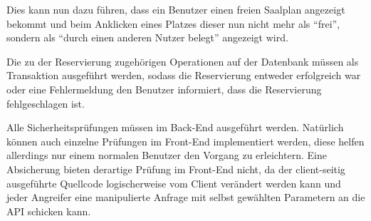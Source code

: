 Dies kann nun dazu führen, dass ein Benutzer einen freien Saalplan angezeigt bekommt und beim Anklicken eines Platzes dieser nun nicht mehr als \enquote{frei}, sondern als \enquote{durch einen anderen Nutzer belegt} angezeigt wird.

Die zu der Reservierung zugehörigen Operationen auf der Datenbank müssen als Transaktion ausgeführt werden, sodass die Reservierung entweder erfolgreich war oder eine Fehlermeldung den Benutzer informiert, dass die Reservierung fehlgeschlagen ist.

Alle Sicherheitsprüfungen müssen im Back-End ausgeführt werden.
Natürlich können auch einzelne Prüfungen im Front-End implementiert werden, diese helfen allerdings nur einem normalen Benutzer den Vorgang zu erleichtern.
Eine Absicherung bieten derartige Prüfung im Front-End nicht, da der client-seitig ausgeführte Quellcode logischerweise vom Client verändert werden kann und jeder Angreifer eine manipulierte Anfrage mit selbst gewählten Parametern an die API schicken kann.